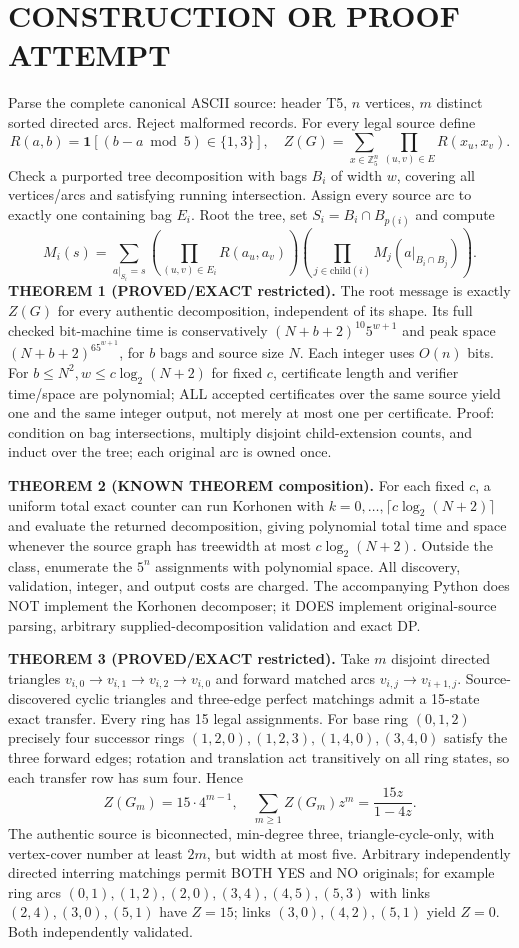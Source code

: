 \documentclass{article}
\begin{document}
\section{CONSTRUCTION OR PROOF ATTEMPT}
Parse the complete canonical ASCII source: header T5, $n$ vertices, $m$ distinct sorted directed arcs. Reject malformed records. For every legal source define
\[
R(a,b)=\mathbf 1[(b-a\bmod 5)\in\{1,3\}],\quad
Z(G)=\sum_{x\in\mathbb Z_5^n}\prod_{(u,v)\in E}R(x_u,x_v).
\]
Check a purported tree decomposition with bags $B_i$ of width $w$, covering all vertices/arcs and satisfying running intersection. Assign every source arc to exactly one containing bag $E_i$. Root the tree, set $S_i=B_i\cap B_{p(i)}$ and compute
\[
M_i(s)=\sum_{a|_{S_i}=s}\left(\prod_{(u,v)\in E_i}R(a_u,a_v)\right)
\left(\prod_{j\in \mathrm{child}(i)}M_j(a|_{B_i\cap B_j})\right).
\]
\textbf{THEOREM 1 (PROVED/EXACT restricted).}
The root message is exactly $Z(G)$ for every authentic decomposition, independent of its shape. Its full checked bit-machine time is conservatively $(N+b+2)^{10}5^{w+1}$ and peak space $(N+b+2)^65^{w+1}$, for $b$ bags and source size $N$. Each integer uses $O(n)$ bits. For $b\le N^2,w\le c\log_2(N+2)$ for fixed $c$, certificate length and verifier time/space are polynomial; ALL accepted certificates over the same source yield one and the same integer output, not merely at most one per certificate. Proof: condition on bag intersections, multiply disjoint child-extension counts, and induct over the tree; each original arc is owned once.

\textbf{THEOREM 2 (KNOWN THEOREM composition).}
For each fixed $c$, a uniform total exact counter can run Korhonen with $k=0,\ldots,\lceil c\log_2(N+2)\rceil$ and evaluate the returned decomposition, giving polynomial total time and space whenever the source graph has treewidth at most $c\log_2(N+2)$. Outside the class, enumerate the $5^n$ assignments with polynomial space. All discovery, validation, integer, and output costs are charged. The accompanying Python does NOT implement the Korhonen decomposer; it DOES implement original-source parsing, arbitrary supplied-decomposition validation and exact DP.

\textbf{THEOREM 3 (PROVED/EXACT restricted).}
Take $m$ disjoint directed triangles $v_{i,0}\to v_{i,1}\to v_{i,2}\to v_{i,0}$ and forward matched arcs $v_{i,j}\to v_{i+1,j}$. Source-discovered cyclic triangles and three-edge perfect matchings admit a 15-state exact transfer. Every ring has 15 legal assignments. For base ring $(0,1,2)$ precisely four successor rings $(1,2,0),(1,2,3),(1,4,0),(3,4,0)$ satisfy the three forward edges; rotation and translation act transitively on all ring states, so each transfer row has sum four. Hence
\[
Z(G_m)=15\cdot4^{m-1},\quad \sum_{m\ge1}Z(G_m)z^m=\frac{15z}{1-4z}.
\]
The authentic source is biconnected, min-degree three, triangle-cycle-only, with vertex-cover number at least $2m$, but width at most five. Arbitrary independently directed interring matchings permit BOTH YES and NO originals; for example ring arcs $(0,1),(1,2),(2,0),(3,4),(4,5),(5,3)$ with links $(2,4),(3,0),(5,1)$ have $Z=15$; links $(3,0),(4,2),(5,1)$ yield $Z=0$. Both independently validated.
\end{document}
